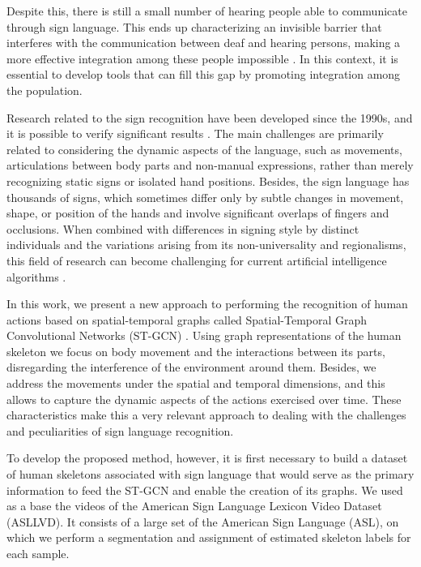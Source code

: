 Despite this, there is still a small number of hearing people able to communicate through sign language. This ends up characterizing an invisible barrier that interferes with the communication between deaf and hearing persons, making a more effective integration among these people impossible \cite{peres-2006}. In this context, it is essential to develop tools that can fill this gap by promoting integration among the population.

Research related to the sign recognition have been developed since the 1990s, and it is possible to verify significant results \cite{lim-2016, recent-advances-dl-2017}. The main challenges are primarily related to considering the dynamic aspects of the language, such as movements, articulations between body parts and non-manual expressions, rather than merely recognizing static signs or isolated hand positions. Besides, the sign language has thousands of signs, which sometimes differ only by subtle changes in movement, shape, or position of the hands and involve significant overlaps of fingers and occlusions. When combined with differences in signing style by distinct individuals and the variations arising from its non-universality and regionalisms, this field of research can become challenging for current artificial intelligence algorithms \cite{konstantinidis-2018}.

In this work, we present a new approach to performing the recognition of human actions based on spatial-temporal graphs called Spatial-Temporal Graph Convolutional Networks (ST-GCN) \cite {st-gcn-2018}. Using graph representations of the human skeleton we focus on body movement and the interactions between its parts, disregarding the interference of the environment around them. Besides, we address the movements under the spatial and temporal dimensions, and this allows to capture the dynamic aspects of the actions exercised over time. These characteristics make this a very relevant approach to dealing with the challenges and peculiarities of sign language recognition.

To develop the proposed method, however, it is first necessary to build a dataset of human skeletons associated with sign language that would serve as the primary information to feed the ST-GCN and enable the creation of its graphs. We used as a base the videos of the American Sign Language Lexicon Video Dataset (ASLLVD). It consists of a large set of the American Sign Language (ASL), on which we perform a segmentation and assignment of estimated skeleton labels for each sample. 


